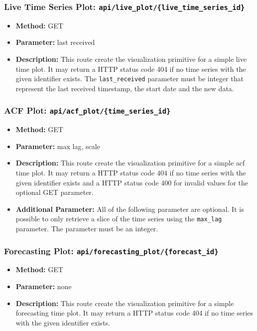 \documentclass[11pt, a4paper]{article}
\begin{document}
\subsubsection*{Live Time Series Plot: \texttt{api/live\_plot/\{live\_time\_series\_id\}}}
\begin{itemize}
 \item[] \textbf{Method:} GET 
 \item[] \textbf{Parameter:} last received
 \item[] \textbf{Description:} This route create the visualization primitive for a simple live time plot.
 It may return a HTTP status code 404 if no time series with the given identifier exists.
 The \texttt{last\_received} parameter must be integer that represent the last received timestamp, the start date and the new data.
\end{itemize}


\subsubsection*{ACF Plot: \texttt{api/acf\_plot/\{time\_series\_id\}}}
\begin{itemize}
 \item[] \textbf{Method:} GET 
 \item[] \textbf{Parameter:} max lag, scale
 \item[] \textbf{Description:} This route create the visualization primitive for a simple acf time plot.
 It may return a HTTP status code 404 if no time series with the given identifier exists and a HTTP status code 400 for invalid values for the optional GET parameter.
 \item[] \textbf{Additional Parameter:} All of the following parameter are optional.
 It is possible to only retrieve a slice of the time series using the \texttt{max\_lag} parameter. The parameter must be an integer.
\end{itemize}


\subsubsection*{Forecasting Plot: \texttt{api/forecasting\_plot/\{forecast\_id\}}}
\begin{itemize}
 \item[] \textbf{Method:} GET 
 \item[] \textbf{Parameter:} none
 \item[] \textbf{Description:} This route create the visualization primitive for a simple forecasting time plot.
 It may return a HTTP status code 404 if no time series with the given identifier exists.
\end{itemize}
\end{document}
